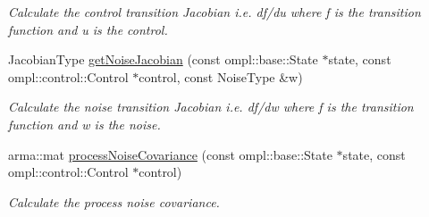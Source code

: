 \begin{DoxyCompactItemize}
\begin{DoxyCompactList}\small\item\em Calculate the control transition Jacobian i.\-e. df/du where f is the transition function and u is the control. \end{DoxyCompactList}\item 
\hypertarget{class_omnidirectional_motion_model_afc6b8e4829e1e2324a9190bf4c87633d}{Jacobian\-Type \hyperlink{class_omnidirectional_motion_model_afc6b8e4829e1e2324a9190bf4c87633d}{get\-Noise\-Jacobian} (const ompl\-::base\-::\-State $\ast$state, const ompl\-::control\-::\-Control $\ast$control, const Noise\-Type \&w)}\label{class_omnidirectional_motion_model_afc6b8e4829e1e2324a9190bf4c87633d}

\begin{DoxyCompactList}\small\item\em Calculate the noise transition Jacobian i.\-e. df/dw where f is the transition function and w is the noise. \end{DoxyCompactList}\item 
\hypertarget{class_omnidirectional_motion_model_ac8eb44d11805f5c445be418ff9b03488}{arma\-::mat \hyperlink{class_omnidirectional_motion_model_ac8eb44d11805f5c445be418ff9b03488}{process\-Noise\-Covariance} (const ompl\-::base\-::\-State $\ast$state, const ompl\-::control\-::\-Control $\ast$control)}\label{class_omnidirectional_motion_model_ac8eb44d11805f5c445be418ff9b03488}

\begin{DoxyCompactList}\small\item\em Calculate the process noise covariance. \end{DoxyCompactList}\end{DoxyCompactItemize}
